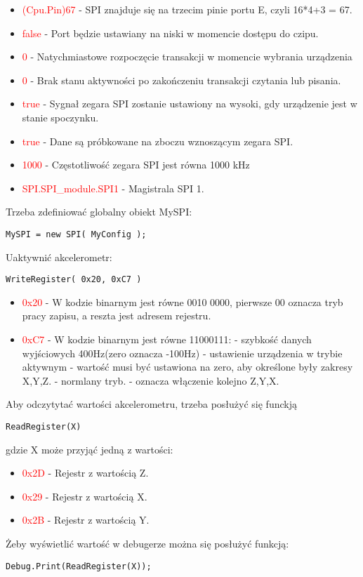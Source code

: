 \documentclass{article}
\begin{document}
\begin{itemize}
\item \textcolor{red}{(Cpu.Pin)67} - SPI znajduje się na trzecim pinie portu E, czyli 16*4+3 = 67.
\item \textcolor{red}{false} - Port będzie ustawiany na niski w momencie dostępu do czipu.
\item \textcolor{red}{0} - Natychmiastowe rozpoczęcie transakcji w momencie wybrania urządzenia
\item \textcolor{red}{0} - Brak stanu aktywności po zakończeniu transakcji czytania lub pisania.
\item \textcolor{red}{true} - Sygnał zegara SPI zostanie ustawiony na wysoki, gdy urządzenie jest w stanie spoczynku.
\item \textcolor{red}{true} -  Dane są próbkowane na zboczu wznoszącym zegara SPI.
\item \textcolor{red}{1000} -  Częstotliwość zegara SPI jest równa 1000 kHz
\item \textcolor{red}{SPI.SPI\_module.SPI1} - Magistrala SPI 1. 
\end{itemize}
Trzeba zdefiniować globalny obiekt MySPI:
\begin{lstlisting}[frame=single]
MySPI = new SPI( MyConfig );
\end{lstlisting}
Uaktywnić akcelerometr:
\begin{lstlisting}[frame=single]
WriteRegister( 0x20, 0xC7 )
\end{lstlisting}
\begin{itemize}
\item \textcolor{red}{0x20} -  W kodzie binarnym jest równe 0010 0000, pierwsze 00 oznacza tryb pracy zapisu, a reszta jest adresem rejestru.
\item \textcolor{red}{0xC7} -  W kodzie binarnym jest równe 11000111: 
 - szybkość danych wyjściowych 400Hz(zero oznacza -100Hz)
 - ustawienie urządzenia w trybie aktywnym
 - wartość musi być ustawiona na zero, aby określone były zakresy X,Y,Z.
 - normlany tryb.
 - oznacza włączenie kolejno Z,Y,X.
\end{itemize}
Aby odczytytać wartości akcelerometru, trzeba posłużyć się funckją 
\begin{lstlisting}[frame=single]
ReadRegister(X)
\end{lstlisting}
gdzie X może przyjąć jedną z wartości:
\begin{itemize}
\item \textcolor{red}{0x2D} - Rejestr z wartością Z.
\item \textcolor{red}{0x29} - Rejestr z wartością X.
\item \textcolor{red}{0x2B} - Rejestr z wartością Y.
\end{itemize}
Żeby wyświetlić wartość w debugerze można się posłużyć funkcją:
\begin{lstlisting}[frame=single]
Debug.Print(ReadRegister(X));
\end{lstlisting}
\end{document}
